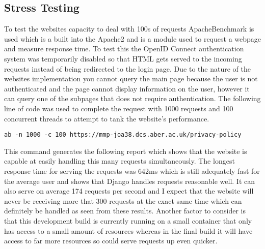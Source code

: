 \subsection{Stress Testing}
To test the websites capacity to deal with 100s of requests ApacheBenchmark \cite{apacheBenchmark} is used which is a built into the Apache2 \cite{apache2} and is a module used to request a webpage and measure response time. To test this the OpenID Connect \cite{OpenID} authentication system  was temporarily disabled so that HTML gets served to the incoming requests instead of being redirected to the login page. Due to the nature of the websites implementation you cannot query the main page because the user is not authenticated and the page cannot display information on the user, however it can query one of the subpages that does not require authentication. The following line of code was used to complete the request with 1000 requests and 100 concurrent threads to attempt to tank the website's performance.

\verb|ab -n 1000 -c 100 https://mmp-joa38.dcs.aber.ac.uk/privacy-policy|

This command generates the following report which shows that the website is capable at easily handling this many requests simultaneously. The longest response time for serving the requests was 642ms which is still adequately fast for the average user and shows that Django handles requests reasonable well. It can also serve on average 174 requests per second and I expect that the website will never be receiving more that 300 requests at the exact same time which can definitely be handled as seen from these results. Another factor to consider is that this development build is currently running on a small container that only has access to a small amount of resources whereas in the final build it will have access to far more resources so could serve requests up even quicker.


